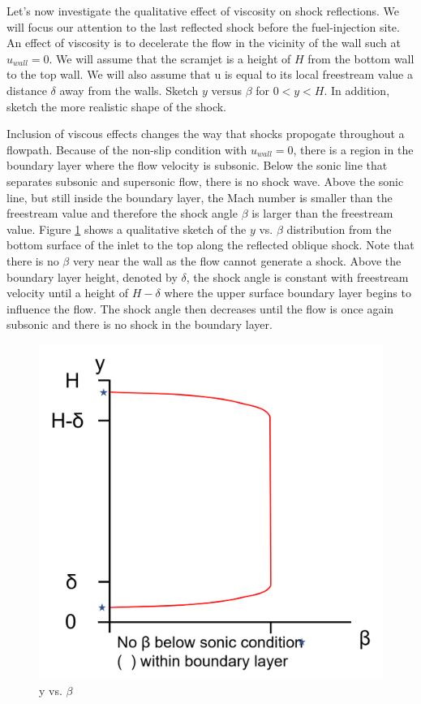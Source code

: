 \documentclass[../main.tex]{subfiles}
\begin{document}

Let's now investigate the qualitative effect of viscosity on shock reflections.
We will focus our attention to the last reflected shock before the fuel-injection site.
An effect of viscosity is to decelerate the flow in the vicinity of the wall such at \(u_{wall}=0\).
We will assume that the scramjet is a height of \(H\) from the bottom wall to the top wall.
We will also assume that u is equal to its local freestream value a distance \(\delta\) away from the walls.
Sketch \(y\) versus \(\beta\) for \(0<y<H\).
In addition, sketch the more realistic shape of the shock.

\discussion{}

Inclusion of viscous effects changes the way that shocks propogate throughout a flowpath.
Because of the non-slip condition with \(u_{wall}=0\), there is a region in the boundary layer where the flow velocity is subsonic.
Below the sonic line that separates subsonic and supersonic flow, there is no shock wave.
Above the sonic line, but still inside the boundary layer, the Mach number is smaller than the freestream value and therefore the shock angle \(\beta\) is larger than the freestream value.
Figure \ref{y_vs_beta} shows a qualitative sketch of the \(y\) vs. \(\beta\) distribution from the bottom surface of the inlet to the top along the reflected oblique shock.
Note that there is no \(\beta\) very near the wall as the flow cannot generate a shock.
Above the boundary layer height, denoted by \(\delta\), the shock angle is constant with freestream velocity until a height of \(H-\delta\) where the upper surface boundary layer begins to influence the flow.
The shock angle then decreases until the flow is once again subsonic and there is no shock in the boundary layer.

\begin{figure}[h!]
    \centering
    \includegraphics[scale=1.0]{../../images/problem_3/y_vs_beta.png}
    \caption{y vs. \(\beta\)}
    \label{y_vs_beta}
\end{figure}
\end{document}
